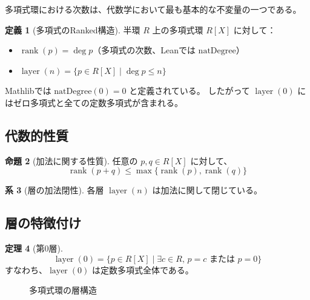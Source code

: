\documentclass[a4paper,11pt]{ltjsarticle}
\theoremstyle{definition}
\newtheorem{definition}{定義}[section]
\newtheorem{theorem}[definition]{定理}
\newtheorem{proposition}[definition]{命題}
\newtheorem{corollary}[definition]{系}
\newcommand{\rank}{\operatorname{rank}}
\newcommand{\layer}{\operatorname{layer}}
\begin{document}
多項式環における次数は、代数学において最も基本的な不変量の一つである。

\begin{definition}[多項式のRanked構造]
\label{def:poly-ranked}
半環 $R$ 上の多項式環 $R[X]$ に対して：
\begin{itemize}
\item $\rank(p) = \deg p$（多項式の次数、Leanでは $\text{natDegree}$）
\item $\layer(n) = \{ p \in R[X] \mid \deg p \leq n \}$
\end{itemize}
\end{definition}

\begin{tcolorbox}[colback=blue!5!white, colframe=blue!75!black, title=重要な注意]
Mathlibでは $\text{natDegree}(0) = 0$ と定義されている。
したがって $\layer(0)$ にはゼロ多項式と全ての定数多項式が含まれる。
\end{tcolorbox}

\subsection{代数的性質}

\begin{proposition}[加法に関する性質]
任意の $p, q \in R[X]$ に対して、
\[
\rank(p + q) \leq \max\{\rank(p), \rank(q)\}
\]
\end{proposition}

\begin{corollary}[層の加法閉性]
各層 $\layer(n)$ は加法に関して閉じている。
\end{corollary}

\subsection{層の特徴付け}

\begin{theorem}[第0層]
\[
\layer(0) = \{ p \in R[X] \mid \exists c \in R,\, p = c \text{ または } p = 0 \}
\]
すなわち、$\layer(0)$ は定数多項式全体である。
\end{theorem}

\begin{figure}[h]
\centering
{}
\caption{多項式環の層構造}
\label{fig:poly-layers}
\end{figure}
\end{document}
